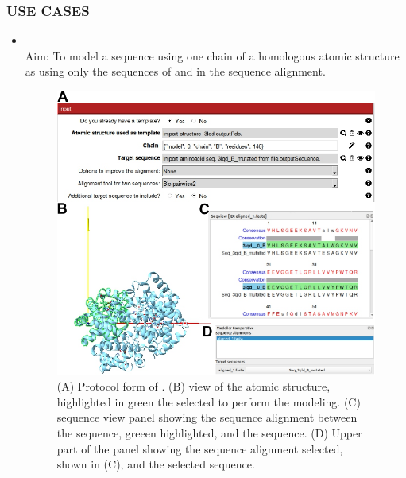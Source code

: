 \subsubsection*{USE CASES}
\begin{itemize}
                \item {}\\
                Aim: To model a  sequence using one chain of a homologous atomic structure as  using only the sequences of  and  in the sequence alignment.

                            \begin{figure}[H]
                            \centering 
                            \captionsetup{width=.9\linewidth} 
                            \includegraphics[width=.9\textwidth]{Images_appendix/Fig305.pdf}
                            \caption{(A) Protocol form of . (B) \chimera view of the  atomic structure, highlighted in green the  selected to perform the modeling. (C) \chimera sequence view panel showing the sequence alignment between the   sequence, greeen highlighted, and the  sequence. (D) Upper part of the \chimera {} panel showing the sequence alignment selected, shown in (C), and the selected  sequence.}  
                            \label{fig:app_protocol_seqHomology_2}
                            \end{figure}
                            

\end{itemize}
